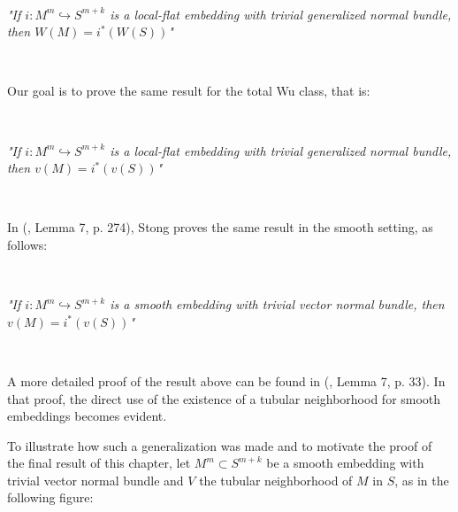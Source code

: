 \documentclass[12pt,oneside]{book}
\begin{document}
    \

    \begin{center}
    	\begin{minipage}{10cm}
    		\textit{"If $i:M^{m}\hookrightarrow S^{m+k}$ is a local-flat embedding with trivial generalized normal 
            bundle, then $W(M)=i^{*}(W(S))$"}
    	\end{minipage}
    \end{center}

    \

    Our goal is to prove the same result for the total Wu class, that is:

    \

    \begin{center}
    	\begin{minipage}{10cm}
    		\textit{"If $i:M^{m}\hookrightarrow S^{m+k}$ is a local-flat embedding with trivial generalized normal 
            bundle, then $v(M)=i^{*}(v(S))$"}
    	\end{minipage}
    \end{center}

    \

    In (\cite{stong}, Lemma 7, p. 274), Stong proves the same result in the smooth setting, as follows:

    \

    \begin{center}
    	\begin{minipage}{10cm}
    		\textit{"If $i:M^{m}\hookrightarrow S^{m+k}$ is a smooth embedding with trivial vector normal 
            bundle, then $v(M)=i^{*}(v(S))$"}
    	\end{minipage}
    \end{center}

    \

    A more detailed proof of the result above can be found in (\cite{joao}, Lemma 7, p. 33). In that proof, the direct use of the existence 
    of a tubular neighborhood for smooth embeddings becomes evident.

    \newpage

    To illustrate how such a generalization was made and to motivate the proof of the final result of this chapter, let 
    $M^{m}\subset S^{m+k}$ be a smooth embedding with trivial vector normal bundle and $V$ the tubular neighborhood of $M$ in $S$, as in the 
    following figure:
\end{document}
